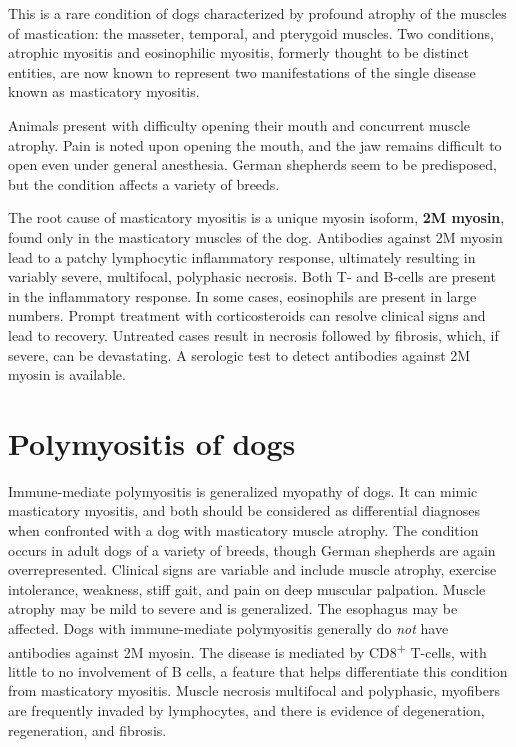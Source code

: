\documentclass[openany]{report}
\begin{document}
This is a rare condition of dogs characterized by profound atrophy of
the muscles of mastication: the masseter, temporal, and pterygoid
muscles. Two conditions, atrophic myositis and eosinophilic myositis,
formerly thought to be distinct entities, are now known to represent two
manifestations of the single disease known as masticatory myositis.

Animals present with difficulty opening their mouth and concurrent
muscle atrophy. Pain is noted upon opening the mouth, and the jaw
remains difficult to open even under general anesthesia. German
shepherds seem to be predisposed, but the condition affects a variety of
breeds.

The root cause of masticatory myositis is a unique myosin isoform,
\textbf{2M myosin}, found only in the masticatory muscles of the dog.
Antibodies against 2M myosin lead to a patchy lymphocytic inflammatory
response, ultimately resulting in variably severe, multifocal,
polyphasic necrosis. Both T- and B-cells are present in the inflammatory
response. In some cases, eosinophils are present in large numbers.
Prompt treatment with corticosteroids can resolve clinical signs and
lead to recovery. Untreated cases result in necrosis followed by
fibrosis, which, if severe, can be devastating. A serologic test to
detect antibodies against 2M myosin is available.

\section{Polymyositis of dogs}\label{polymyositis-of-dogs}

Immune-mediate polymyositis is generalized myopathy of dogs. It can
mimic masticatory myositis, and both should be considered as
differential diagnoses when confronted with a dog with masticatory
muscle atrophy. The condition occurs in adult dogs of a variety of
breeds, though German shepherds are again overrepresented. Clinical
signs are variable and include muscle atrophy, exercise intolerance,
weakness, stiff gait, and pain on deep muscular palpation. Muscle
atrophy may be mild to severe and is generalized. The esophagus may be
affected. Dogs with immune-mediate polymyositis generally do \emph{not}
have antibodies against 2M myosin. The disease is mediated by
CD8\textsuperscript{+} T-cells, with little to no involvement of B
cells, a feature that helps differentiate this condition from
masticatory myositis. Muscle necrosis multifocal and polyphasic,
myofibers are frequently invaded by lymphocytes, and there is evidence
of degeneration, regeneration, and fibrosis.
\end{document}
